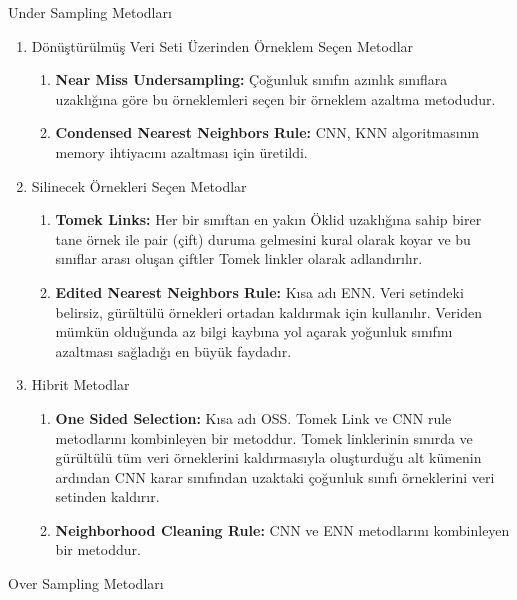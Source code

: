 Under Sampling Metodları
\begin{enumerate}
    \item Dönüştürülmüş Veri Seti Üzerinden Örneklem Seçen Metodlar
    \begin{enumerate}
        \item \textbf{Near Miss Undersampling:} Çoğunluk sınıfın azınlık sınıflara uzaklığına göre bu örneklemleri seçen bir örneklem azaltma metodudur.
        \item \textbf{Condensed Nearest Neighbors Rule:} CNN, KNN algoritmasının memory ihtiyacını azaltması için üretildi.
    \end{enumerate}
    \item Silinecek Örnekleri Seçen Metodlar
    \begin{enumerate}
        \item \textbf{Tomek Links:} Her bir sınıftan en yakın Öklid uzaklığına sahip birer tane örnek ile pair (çift) duruma gelmesini kural olarak koyar ve bu sınıflar arası oluşan çiftler Tomek linkler olarak adlandırılır.
        \item \textbf{Edited Nearest Neighbors Rule:} Kısa adı ENN. Veri setindeki belirsiz, gürültülü örnekleri ortadan kaldırmak için kullanılır. Veriden mümkün olduğunda az bilgi kaybına yol açarak yoğunluk sınıfını azaltması sağladığı en büyük faydadır.
    \end{enumerate}
    \item Hibrit Metodlar
    \begin{enumerate}
        \item \textbf{One Sided Selection:} Kısa adı OSS. Tomek Link ve CNN rule metodlarını kombinleyen bir metoddur. Tomek linklerinin sınırda ve gürültülü tüm veri örneklerini kaldırmasıyla oluşturduğu alt kümenin ardından CNN karar sınıfından uzaktaki çoğunluk sınıfı örneklerini veri setinden kaldırır.
        \item \textbf{Neighborhood Cleaning Rule:} CNN ve ENN metodlarını kombinleyen bir metoddur.
    \end{enumerate}
\end{enumerate}

Over Sampling Metodları

